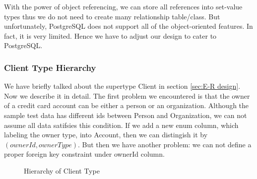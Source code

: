 \documentclass[11pt]{article}
\begin{document}
\par
With the power of object referencing, we can store all references into set-value types thus we do not need to create many relationship table/class. But unfortunately, PostgreSQL does not support all of the object-oriented features. In fact, it is very limited. Hence we have to adjust our design to cater to PostgreSQL.


\subsubsection{Client Type Hierarchy}

\par
We have briefly talked about the supertype Client in section \ref{sec:E-R design}. Now we describe it in detail. The first problem we encountered is that the owner of a credit card account can be either a person or an organization. Although the sample test data has different ids between Person and Organization, we can not assume all data satifsies this condition. If we add a new enum column, which labeling the owner type, into Account, then we can distingish it by $(ownerId, ownerType)$. But then we have another problem: we can not define a proper foreign key constraint under ownerId column.

\begin{figure}
\caption{Hierarchy of Client Type}
\label{fig:clienthierarchy}
\end{figure}
\end{document}
